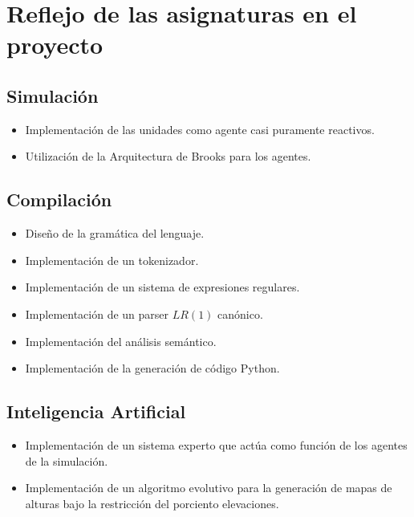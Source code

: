 \section{Reflejo de las asignaturas en el proyecto}

\subsection{Simulación}

\begin{itemize}
    \item Implementación de las unidades como agente casi puramente reactivos.
    \item Utilización de la Arquitectura de Brooks para los agentes.
\end{itemize}

\subsection{Compilación}

\begin{itemize}
    \item Diseño de la gramática del lenguaje.
    \item Implementación de un tokenizador.
    \item Implementación de un sistema de expresiones regulares.
    \item Implementación de un parser $LR(1)$ canónico.
    \item Implementación del análisis semántico.
    \item Implementación de la generación de código Python.
\end{itemize}

\subsection{Inteligencia Artificial}

\begin{itemize}
    \item Implementación de un sistema experto que actúa como función de los agentes de la simulación.
    \item Implementación de un algoritmo evolutivo para la generación de mapas de alturas bajo la restricción del porciento elevaciones.
\end{itemize}